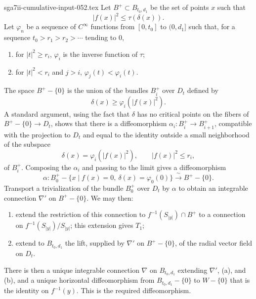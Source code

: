 \begin{filecontents*}{sga7ii-cumulative-input-052.tex}
Let $B^+\subset B_{t_0,d_1}$ be the set of points $x$ such that
\[
|f(x)|^2\leq\tau(\delta(x)).
\]
Let $\varphi_n$ be a sequence of $C^\infty$ functions from
$[0,t_0]$ to $(0,d_1]$ such that, for a sequence
$t_0>r_1>r_2>\cdots$ tending to $0$,

\begin{enumerate}[label=(\alph*)]
\item for $|t|^2\geq r_i$, $\varphi_i$ is the inverse function of
  $\tau$;
\item for $|t|^2<r_i$ and $j>i$,
  $\varphi_j(t)<\varphi_i(t)$.
\end{enumerate}

\begin{center}
\end{center}

The space $B^+-\{0\}$ is the union of the bundles $B_i^+$ over
$D_t$ defined by
\[
\delta(x)\geq\varphi_i(|f(x)|^2).
\]
A standard argument, using the fact that $\delta$ has no critical
points on the fibers of $B^+-\{0\}\to D_t$, shows that there is a
diffeomorphism $\alpha_i:B_i^+\to B_{i+1}^+$, compatible with the
projection to $D_t$ and equal to the identity outside a small
neighborhood of the subspace
\[
\delta(x)=\varphi_i(|f(x)|^2),
\qquad |f(x)|^2\leq r_i,
\]
of $B_i^+$.  Composing the $\alpha_i$ and passing to the limit gives
a diffeomorphism
\[
\alpha:B_0^+-\{x\mid f(x)=0,\ \delta(x)=\varphi_0(0)\}
\xrightarrow{\ \sim\ }B^+-\{0\}.
\]
Transport a trivialization of the bundle $B_0^+$ over $D_t$ by
$\alpha$ to obtain an integrable connection $\nabla'$ on
$B^+-\{0\}$.  We may then:

\begin{enumerate}[label=(\alph*)]
\item extend the restriction of this connection to
  $f^{-1}(S_{|y|})\cap B^+$ to a connection on
  $f^{-1}(S_{|y|})/S_{|y|}$; this extension gives $T_1$;
\item extend to $B_{t_0,d_1}$ the lift, supplied by $\nabla'$ on
  $B^+-\{0\}$, of the radial vector field on $D_t$.
\end{enumerate}

There is then a unique integrable connection $\nabla$ on
$B_{t_0,d_1}$ extending $\nabla'$, (a), and (b), and a unique
horizontal diffeomorphism from $B_{t_0,d_1}-\{0\}$ to $W-\{0\}$
that is the identity on $f^{-1}(y)$.  This is the required
diffeomorphism.

\end{filecontents*}
